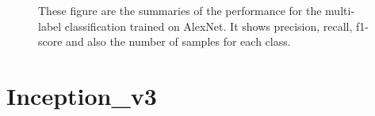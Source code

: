 \begin{figure}
\caption [Performance summary of the Components class trained on AlexNet]{These figure are the summaries of the performance for the multi-label classification trained on AlexNet. It shows precision, recall, f1-score and also the number of samples for each class.}
\label{fig:perf_al}
\end{figure}



\section{Inception\_v3}\label{sec:gogl}
